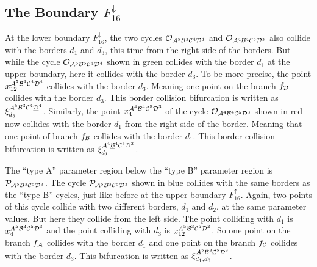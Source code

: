 \subsection{The Boundary $F_{16}^\downarrow$}
\label{sec:arch.bif.D}

At the lower boundary $F_{16}^\downarrow$, the two cycles $\mathcal{O}_{\mathcal{A}^5\mathcal{B}^3\mathcal{C}^4\mathcal{D}^4}$ and $\mathcal{O}_{\mathcal{A}^4\mathcal{B}^4\mathcal{C}^5\mathcal{D}^3}$ also collide with the borders $d_1$ and $d_3$, this time from the right side of the borders.
But while the cycle $\mathcal{O}_{\mathcal{A}^5\mathcal{B}^5\mathcal{C}^4\mathcal{D}^4}$ shown in green collides with the border $d_1$ at the upper boundary, here it collides with the border $d_3$.
To be more precise, the point $x_{12}^{\mathcal{A}^5\mathcal{B}^3\mathcal{C}^4\mathcal{D}^4}$ collides with the border $d_3$.
Meaning one point on the branch $f_{\mathcal{D}}$ collides with the border $d_3$.
This border collision bifurcation is written as $\xi_{d_3}^{\mathcal{A}^5\mathcal{B}^3\mathcal{C}^4\underline{\mathcal{D}}^4}$.
Similarly, the point $x_{4}^{\mathcal{A}^4\mathcal{B}^4\mathcal{C}^5\mathcal{D}^3}$ of the cycle $\mathcal{O}_{\mathcal{A}^4\mathcal{B}^4\mathcal{C}^5\mathcal{D}^3}$ shown in red now collides with the border $d_1$ from the right side of the border.
Meaning that one point of branch $f_{\mathcal{B}}$ collides with the border $d_1$.
This border collision bifurcation is written as $\xi_{d_1}^{\mathcal{A}^4\underline{\mathcal{B}}^4\mathcal{C}^5\mathcal{D}^3}$.

The ``type A'' parameter region below the ``type B'' parameter region is $\mathcal{P}_{\mathcal{A}^5\mathcal{B}^3\mathcal{C}^5\mathcal{D}^3}$.
The cycle $\mathcal{P}_{\mathcal{A}^5\mathcal{B}^3\mathcal{C}^5\mathcal{D}^3}$ shown in blue collides with the same borders as the ``type B'' cycles, just like before at the upper boundary $F_{16}^\uparrow$.
Again, two points of this cycle collide with two different borders, $d_1$ and $d_2$, at the same parameter values.
But here they collide from the left side.
The point colliding with $d_1$ is $x_{4}^{A^5\mathcal{B}^3\mathcal{C}^5\mathcal{D}^3}$ and the point colliding with $d_3$ is $x_{12}^{A^5\mathcal{B}^3\mathcal{C}^5\mathcal{D}^3}$.
So one point on the branch $f_{\mathcal{A}}$ collides with the border $d_1$ and one point on the branch $f_{\mathcal{C}}$ collides with the border $d_3$.
This bifurcation is written as $\xi_{d_1, d_3}^{\underline{\mathcal{A}}^5\mathcal{B}^3\underline{\mathcal{C}}^5\mathcal{D}^3}$.

